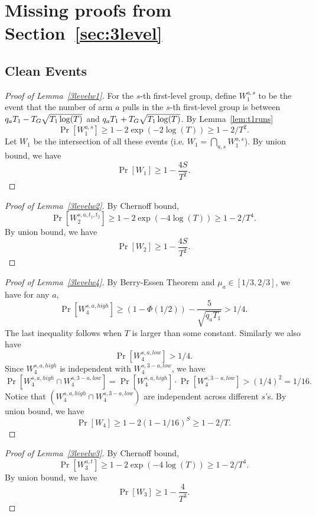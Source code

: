 \section{Missing proofs from Section~\ref{sec:3level}}

\subsection{Clean Events}


\begin{proof}[Proof of Lemma~\ref{3levelw1}]
  For the $s$-th first-level group, define $W_1^{a,s}$ to be the event
  that the number of arm $a$ pulls in the $s$-th first-level group is
  between $q_a T_1- T_G \sqrt{T_1\log(T)}$ and
  $q_a T_1 + T_G \sqrt{T_1\log(T)}$. By Lemma~\ref{lem:t1runs}
\[
\Pr[W_1^{a,s}] \geq 1-2\exp(-2\log(T)) \geq 1-2/T^2.
\]
Let $W_1$  be the intersection of all these events (i.e.
$W_1 = \bigcap_{a,s}W_1^{a,s}$). By union bound, we have
\[
\Pr[W_1] \geq 1- \frac{4S}{T^2}.
\]
\end{proof}



\begin{proof}[Proof of Lemma~\ref{3levelw2}]
  By Chernoff bound,
\[
\Pr[W_2^{s,a,t_1,t_2}] \geq 1 - 2\exp(-4\log(T)) \geq 1- 2/T^4.
\]
By union bound, we have
\[
\Pr[W_2] \geq 1- \frac{4S}{T^2}.
\]
\end{proof}


\begin{proof}[Proof of Lemma~\ref{3levelw4}]
By Berry-Essen Theorem and
  $\mu_a \in [1/3,2/3]$, we have for any $a$,
\[
\Pr[W_4^{s,a,high}] \geq (1-\Phi(1/2)) - \frac{5}{\sqrt{q_aT_1}} > 1/4.
\]
The last inequality follows when $T$ is larger than some constant.
Similarly we also have 
\[
\Pr[W_4^{s,a,low}] > 1/4.
\]
Since $W_4^{s,a,high}$ is independent with $W_4^{s,3-a,low}$, we have
\[
\Pr[W_4^{s,a,high} \cap W_4^{s,3-a,low}] =\Pr[W_4^{s,a,high}] \cdot  \Pr[W_4^{s,3-a,low}]>(1/4)^2 = 1/16.
\]
Notice that $(W_4^{s,a,high} \cap W_4^{s,3-a,low})$ are independent
across different $s$'s. By union bound, we have
\[
\Pr[W_4] \geq 1- 2(1-1/16)^S \geq 1 -2 /T.
\]
\end{proof}



\begin{proof}[Proof of Lemma~\ref{3levelw3}]
By Chernoff bound,
\[
\Pr[W_3^{a,t}] \geq 1 - 2\exp(-4\log(T)) \geq 1- 2/T^4.
\]
By union bound, we have
\[
\Pr[W_3] \geq 1- \frac{4}{T^3}.
\]
\end{proof}


